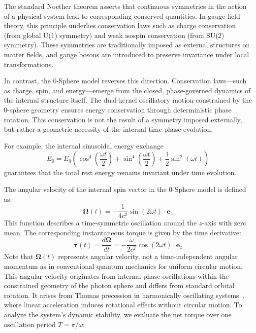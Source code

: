 \documentclass[%
 reprint,
 amsmath,amssymb,
 aps,
]{revtex4-1}
\numberwithin{equation}{section}%
\begin{document}
The standard Noether theorem asserts that continuous symmetries in the action of a physical system lead to corresponding conserved quantities. In gauge field theory, this principle underlies conservation laws such as charge conservation (from global U(1) symmetry) and weak isospin conservation (from SU(2) symmetry). These symmetries are traditionally imposed as external structures on matter fields, and gauge bosons are introduced to preserve invariance under local transformations.

In contrast, the 0-Sphere model reverses this direction. Conservation laws—such as charge, spin, and energy—emerge from the closed, phase-governed dynamics of the internal structure itself. The dual-kernel oscillatory motion constrained by the 0-sphere geometry ensures energy conservation through deterministic phase rotation. This conservation is not the result of a symmetry imposed externally, but rather a geometric necessity of the internal time-phase evolution.

For example, the internal sinusoidal energy exchange
\begin{equation}
E_0 = E_0 \left( \cos^4\left(\frac{\omega t}{2}\right) + \sin^4\left(\frac{\omega t}{2}\right) + \frac{1}{2}\sin^2(\omega t) \right)
\label{eq:energy_conservation_sinusoidal}
\end{equation}
guarantees that the total rest energy remains invariant under time evolution.

The angular velocity of the internal spin vector in the 0-Sphere model is defined as:
\begin{equation}
\boldsymbol{\Omega}(t) = -\frac{1}{4c^2} \sin(2\omega t) \cdot \boldsymbol{e}_z
\label{eq:angular_velocity_internal}
\end{equation}
This function describes a time-symmetric oscillation around the $z$-axis with zero mean. The corresponding instantaneous torque is given by the time derivative:
\begin{equation}
\boldsymbol{\tau}(t) = \frac{d\boldsymbol{\Omega}}{dt} = -\frac{\omega}{2c^2} \cos(2\omega t) \cdot \boldsymbol{e}_z
\label{eq:instantaneous_torque}
\end{equation}
Note that $\boldsymbol{\Omega}(t)$ represents angular velocity, not a time-independent angular momentum as in conventional quantum mechanics for uniform circular motion. This angular velocity originates from internal phase oscillations within the constrained geometry of the photon sphere and differs from standard orbital rotation. It arises from Thomas precession in harmonically oscillating systems~\cite{thomas1926}, where linear acceleration induces rotational effects without circular motion. To analyze the system's dynamic stability, we evaluate the net torque over one oscillation period $T = \pi/\omega$:
\end{document}
